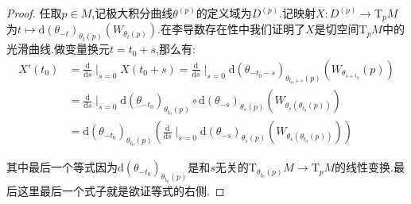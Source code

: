 \begin{enumerate}
\begin{proof}
		任取$p\in M$,记极大积分曲线$\theta^{(p)}$的定义域为$D^{(p)}$.记映射$X:D^{(p)}\to\mathrm{T}_pM$为$t\mapsto\mathrm{d}(\theta_{-t})_{\theta_{t}(p)}(W_{\theta_t(p)})$.在李导数存在性中我们证明了$X$是切空间$\mathrm{T}_pM$中的光滑曲线.做变量换元$t=t_0+s$,那么有:
		\begin{align*}
		X'(t_0)&=\frac{\mathrm{d}}{\mathrm{d}s}\mid_{s=0}X(t_0+s)=\frac{\mathrm{d}}{\mathrm{d}s}\mid_{s=0}\mathrm{d}(\theta_{-t_0-s})_{\theta_{t_0+s}(p)}(W_{\theta_{s+t_0}}(p))\\&=\frac{\mathrm{d}}{\mathrm{d}s}\mid_{s=0}\mathrm{d}(\theta_{-t_0})_{\theta_{t_0}(p)}\circ\mathrm{d}(\theta_{-s})_{\theta_{s}(p)}(W_{\theta_s(\theta_{t_0}(p))})\\&=\mathrm{d}(\theta_{-t_0})_{\theta_{t_0}(p)}\left(\frac{\mathrm{d}}{\mathrm{d}s}\mid_{s=0}\mathrm{d}(\theta_{-s})_{\theta_s(p)}(W_{\theta_s(\theta_{t_0}(p))})\right)
		\end{align*}
		
		其中最后一个等式因为$\mathrm{d}(\theta_{-t_0})_{\theta_{t_0}(p)}$是和$s$无关的$\mathrm{T}_{\theta_{t_0}(p)}M\to\mathrm{T}_pM$的线性变换.最后这里最后一个式子就是欲证等式的右侧.
	\end{proof}
\end{enumerate}

